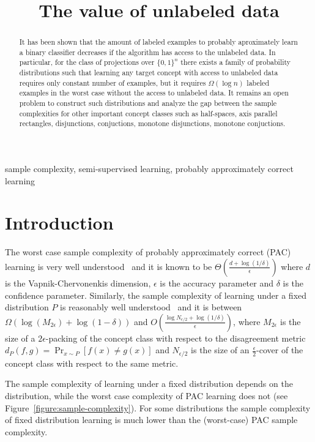 \documentclass[12pt]{colt2019}
\title{The value of unlabeled data}
\begin{document}
\maketitle

\begin{abstract}
It has been shown that the amount of labeled examples to probably aproximately
learn a binary classifier decreases if the algorithm has access to the unlabeled
data. In particular, for the class of projections over $\{0,1\}^n$ there exists
a family of probability distributions such that learning any target concept with
access to unlabeled data requires only constant number of examples, but it
requires $\Omega(\log n)$ labeled examples in the worst case without the access
to unlabeled data. It remains an open problem to construct such distributions
and analyze the gap between the sample complexities for other important concept
classes such as half-spaces, axis parallel rectangles, disjunctions,
conjuctions, monotone disjunctions, monotone conjuctions.
\end{abstract}

\begin{keywords}
sample complexity, semi-supervised learning, probably approximately correct
learning
\end{keywords}

\section{Introduction}

The worst case sample complexity of probably approximately correct (PAC)
learning is very well understood~\citep{Hanneke-2016} and it is known to be
$\Theta \left(\frac{d + \log(1/\delta)}{\epsilon}\right)$ where $d$ is the
Vapnik-Chervonenkis dimension, $\epsilon$ is the accuracy parameter and $\delta$
is the confidence parameter. Similarly, the sample complexity of learning under
a fixed distribution $P$ is reasonably well understood~\citep{Benedek-Itai-1991}
and it is between $\Omega(\log(M_{2\epsilon}) + \log(1-\delta))$ and $O
\left(\frac{\log N_{\epsilon/2} + \log(1/\delta)}{\epsilon} \right)$, where
$M_{2\epsilon}$ is the size of a $2\epsilon$-packing of the concept class with
respect to the disagreement metric $d_P(f,g) = \Pr_{x \sim P}[f(x) \neq g(x)]$
and $N_{\epsilon/2}$ is the size of an $\frac{\epsilon}{2}$-cover of the concept
class with respect to the same metric.

The sample complexity of learning under a fixed distribution depends on the
distribution, while the worst case complexity of PAC learning does not (see
Figure~\ref{figure:sample-complexity}). For some distributions the sample
complexity of fixed distribution learning is much lower than the (worst-case)
PAC sample complexity.
\end{document}
